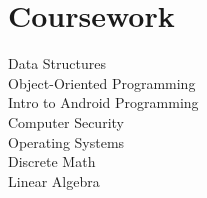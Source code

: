 \documentclass[letterpaper]{deedy-resume} %
\begin{document}
\begin{minipage}[t]{0.33\textwidth}
\section{Coursework}

Data Structures\\
Object-Oriented Programming\\
Intro to Android Programming\\
Computer Security\\
Operating Systems\\
Discrete Math\\
Linear Algebra




\end{minipage} %
\hfill
%
%
\end{document}
